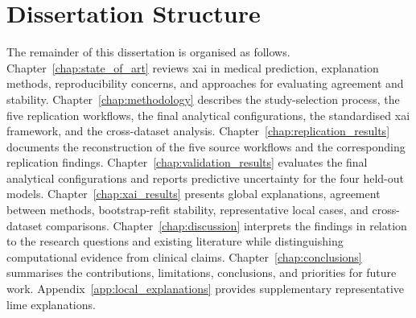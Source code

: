 \section{Dissertation Structure}

The remainder of this dissertation is organised as follows. Chapter~\ref{chap:state_of_art} reviews \gls{xai} in medical prediction, explanation methods, reproducibility concerns, and approaches for evaluating agreement and stability. Chapter~\ref{chap:methodology} describes the study-selection process, the five replication workflows, the final analytical configurations, the standardised \gls{xai} framework, and the cross-dataset analysis. Chapter~\ref{chap:replication_results} documents the reconstruction of the five source workflows and the corresponding replication findings. Chapter~\ref{chap:validation_results} evaluates the final analytical configurations and reports predictive uncertainty for the four held-out models. Chapter~\ref{chap:xai_results} presents global explanations, agreement between methods, bootstrap-refit stability, representative local cases, and cross-dataset comparisons. Chapter~\ref{chap:discussion} interprets the findings in relation to the research questions and existing literature while distinguishing computational evidence from clinical claims. Chapter~\ref{chap:conclusions} summarises the contributions, limitations, conclusions, and priorities for future work. Appendix~\ref{app:local_explanations} provides supplementary representative \gls{lime} explanations.
